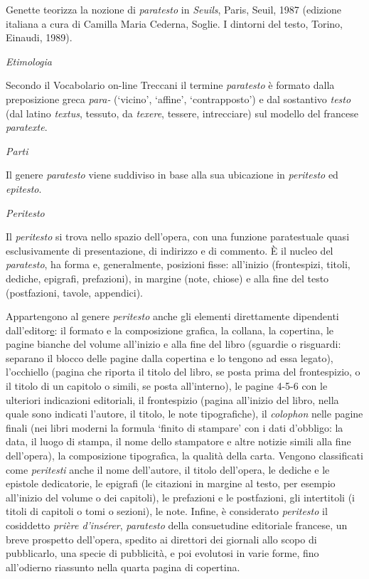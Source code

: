 {Genette teorizza la nozione di \emph{paratesto} in \emph{Seuils}, Paris,
Seuil, 1987 (edizione italiana a cura di Camilla Maria Cederna, Soglie.
I dintorni del testo, Torino, Einaudi, 1989).

\emph{Etimologia}

Secondo il Vocabolario on-line Treccani il termine \emph{paratesto} è
formato dalla preposizione greca \emph{para-} (`vicino', `affine',
`contrapposto') e dal sostantivo \emph{testo} (dal latino \emph{textus},
tessuto, da \emph{texere}, tessere, intrecciare) sul modello del
francese \emph{paratexte}.

\emph{Parti}

Il genere \emph{paratesto} viene suddiviso in base alla sua ubicazione
in \emph{peritesto} ed \emph{epitesto}.

\emph{Peritesto}

Il \emph{peritesto} si trova nello spazio dell'opera, con una funzione
paratestuale quasi esclusivamente di presentazione, di indirizzo e di
commento. È il nucleo del \emph{paratesto}, ha forma e, generalmente,
posizioni fisse: all'inizio (frontespizi, titoli, dediche, epigrafi,
prefazioni), in margine (note, chiose) e alla fine del testo
(postfazioni, tavole, appendici).

Appartengono al genere \emph{peritesto} anche gli elementi direttamente
dipendenti dall'editor\href{https://it.wikipedia.org/wiki/Editore}{e}:
il formato e la composizione grafica, la collana, la copertina, le
pagine bianche del volume all'inizio e alla fine del libro (sguardie o
risguardi: separano il blocco delle pagine dalla copertina e lo tengono
ad essa legato), l'occhiello (pagina che riporta il titolo del libro, se
posta prima del frontespizio, o il titolo di un capitolo o simili, se
posta all'interno), le pagine 4-5-6 con le ulteriori indicazioni
editoriali, il frontespizio (pagina all'inizio del libro, nella quale
sono indicati l'autore, il titolo, le note tipografiche), il
\emph{colophon} nelle pagine finali (nei libri moderni la formula
`finito di stampare' con i dati d'obbligo: la data, il luogo di stampa,
il nome dello stampatore e altre notizie simili alla fine dell'opera),
la composizione tipografica, la qualità della carta. Vengono
classificati come \emph{peritesti} anche il nome dell'autore, il titolo
dell'opera, le dediche e le epistole dedicatorie, le epigrafi (le
citazioni in margine al testo, per esempio all'inizio del volume o dei
capitoli), le prefazioni e le postfazioni, gli intertitoli (i titoli di
capitoli o tomi o sezioni), le note. Infine, è considerato
\emph{peritesto} il cosiddetto \emph{prière d'insérer}, \emph{paratesto}
della consuetudine editoriale francese, un breve prospetto dell'opera,
spedito ai direttori dei giornali allo scopo di pubblicarlo, una specie
di pubblicità, e poi evolutosi in varie forme, fino all'odierno
riassunto nella quarta pagina di copertina.

}
